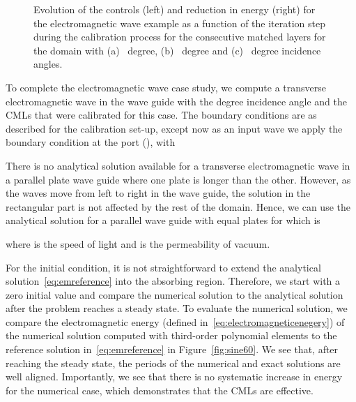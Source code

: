 \documentclass[a4paper]{article}
\begin{document}
\begin{figure}
{
}   \caption{Evolution of the controls (left) and reduction in energy
    (right) for the electromagnetic wave example as a function of the
    iteration step during the calibration process for the consecutive
    matched layers for the domain with (a)~ degree, (b)~
    degree and (c)~ degree incidence angles.}
  \label{fig:em_historyall}
\end{figure}

To complete the electromagnetic wave case study, we compute a
transverse electromagnetic wave in the wave guide with the  degree
incidence angle and the CMLs that were calibrated for this case.  The
boundary conditions are as described for the calibration set-up,
except now as an input wave we apply the boundary condition  at the port (), with

There is no analytical solution available for a transverse
electromagnetic wave in a parallel plate wave guide where one plate is
longer than the other.  However, as the waves move from left to right
in the wave guide, the solution in the rectangular part  is not affected by
the rest of the domain. Hence, we can use the analytical solution for
a parallel wave guide with equal plates for  which is

where  is the speed of light and  is the permeability of
vacuum.

For the initial condition, it is not straightforward to extend the
analytical solution~\eqref{eq:emreference} into the absorbing region.
Therefore, we start with a zero initial value and compare the
numerical solution to the analytical solution after the problem
reaches a steady state.  To evaluate the numerical solution, we
compare the electromagnetic energy (defined
in~\eqref{eq:electromagneticenegery}) of the numerical solution
computed with third-order polynomial elements to the reference
solution in~\eqref{eq:emreference} in 
Figure~\ref{fig:sine60}.  We see that, after reaching the steady
state, the periods of the numerical and exact solutions are well
aligned. Importantly, we see that there is no systematic increase in
energy for the numerical case, which demonstrates that the CMLs are
effective.
\end{document}
